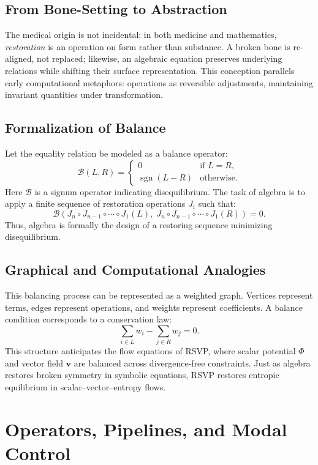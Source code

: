 \documentclass[a4paper,11pt,openany]{book}
\begin{document}
\section{From Bone-Setting to Abstraction}
The medical origin is not incidental: in both medicine and mathematics, \emph{restoration} is an operation on form rather than substance. 
A broken bone is re-aligned, not replaced; likewise, an algebraic equation preserves underlying relations while shifting their surface representation. 
This conception parallels early computational metaphors: operations as reversible adjustments, maintaining invariant quantities under transformation.

\section{Formalization of Balance}
Let the equality relation be modeled as a balance operator:
\[
\mathcal{B}(L,R) = \begin{cases}
0 & \text{if } L=R, \\
\operatorname{sgn}(L-R) & \text{otherwise}.
\end{cases}
\]
Here $\mathcal{B}$ is a signum operator indicating disequilibrium. 
The task of algebra is to apply a finite sequence of restoration operations $J_i$ such that:
\[
\mathcal{B}\!\left(J_n\circ J_{n-1}\circ \cdots \circ J_1(L), \;
J_n\circ J_{n-1}\circ \cdots \circ J_1(R)\right) = 0.
\]
Thus, algebra is formally the design of a restoring sequence minimizing disequilibrium.

\section{Graphical and Computational Analogies}
This balancing process can be represented as a weighted graph. 
Vertices represent terms, edges represent operations, and weights represent coefficients. 
A balance condition corresponds to a conservation law:
\[
\sum_{i \in L} w_i - \sum_{j \in R} w_j = 0.
\]
This structure anticipates the flow equations of RSVP, where scalar potential $\Phi$ and vector field $\mathbf{v}$ are balanced across divergence-free constraints. 
Just as algebra restores broken symmetry in symbolic equations, RSVP restores entropic equilibrium in scalar–vector–entropy flows.

\chapter{Operators, Pipelines, and Modal Control}
\end{document}

